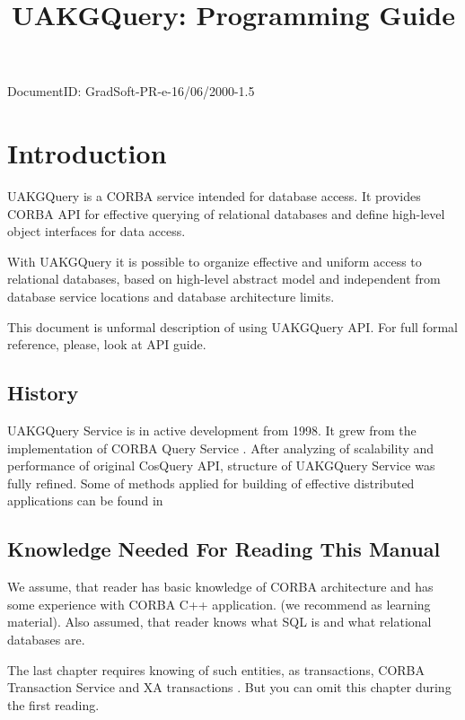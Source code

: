 \documentclass[10pt]{article}
\title{ UAKGQuery: Programming Guide }
\begin{document}
\maketitle{}
DocumentID: GradSoft-PR-e-16/06/2000-1.5

\tableofcontents

\section{ Introduction }

 UAKGQuery is a CORBA \cite{OMG-CORBA-1} service intended for database
 access. It provides CORBA API for effective querying of relational
 databases and define high-level object interfaces for data access.

 With UAKGQuery it is possible to organize effective and uniform access
 to relational databases, based on high-level abstract model and independent
  from database service locations and database architecture limits.

 This document is unformal description of using UAKGQuery API. 
 For full formal reference, please, look at API guide.

 \subsection{History}

 UAKGQuery Service is in active development from 1998. 
 It grew from the implementation of CORBA Query Service
 \cite{OMG-Cos-Query}. After analyzing of scalability and performance
of original CosQuery API, structure of UAKGQuery Service was fully refined.
Some of methods applied for building of effective distributed applications
can be found in \cite{rssh-1} \cite{rssh-2}

 \subsection{ Knowledge Needed For Reading This Manual }

 We assume, that reader has basic knowledge of CORBA architecture
 \cite{OMG-CORBA-1} and has some experience with CORBA C++ application.
 (we recommend \cite{Adv-CORBA-Programming} as learning material).
 Also assumed, that reader knows what SQL is and what relational databases are.

 The last chapter requires knowing of such entities, as transactions, 
 CORBA Transaction Service \cite{OMG-COS-OTS} and XA transactions 
 \cite{XOPEN-XA}.  But you can omit this chapter during the first reading.
\end{document}
